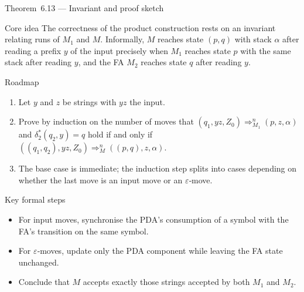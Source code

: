 \begin{frame}[t]{Theorem 6.13 — Invariant and proof sketch}
  \begin{tblock}{Core idea}
    The correctness of the product construction rests on an invariant
    relating runs of $M_1$ and $M$.  Informally, $M$ reaches state
    $(p,q)$ with stack $\alpha$ after reading a prefix $y$ of the input
    precisely when $M_1$ reaches state $p$ with the same stack after
    reading $y$, and the FA $M_2$ reaches state $q$ after reading $y$.
  \end{tblock}
  \begin{tblock}{Roadmap}
    \begin{enumerate}
      \item Let $y$ and $z$ be strings with $y z$ the input.
      \item Prove by induction on the number of moves that
        $(q_1, y z, Z_0) \Rightarrow^n_{M_1} (p, z, \alpha)$ and
        $\delta_2^\ast(q_2, y) = q$ hold if and only if
        $((q_1,q_2), y z, Z_0) \Rightarrow^n_M ((p,q), z, \alpha)$.
      \item The base case is immediate; the induction step splits into
        cases depending on whether the last move is an input move or an
        $\varepsilon$‑move.
    \end{enumerate}
  \end{tblock}
  \begin{tblock}{Key formal steps}
    \begin{itemize}
      \item For input moves, synchronise the PDA’s consumption of a
        symbol with the FA’s transition on the same symbol.
      \item For $\varepsilon$‑moves, update only the PDA component while
        leaving the FA state unchanged.
      \item Conclude that $M$ accepts exactly those strings accepted by
        both $M_1$ and $M_2$.
    \end{itemize}
  \end{tblock}
  \label{fr:6.2-16}
\end{frame}

